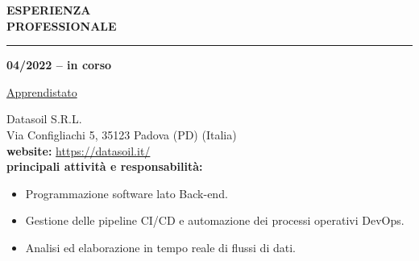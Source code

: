 \hspace{5mm}
\begin{minipage}[b]{0.3\textwidth}
	\textbf{ESPERIENZA \\PROFESSIONALE}
\end{minipage}%
\hfill
\hfill
\begin{minipage}[t]{0.6\textwidth}		
	\rule{\textwidth}{0.4pt}
\end{minipage}%
\vspace{5mm}


\begin{minipage}[t]{0.3\textwidth}
	\textbf{04/2022 – in corso}
\end{minipage}%
\hfill
\hfill
\begin{minipage}[t]{0.6\textwidth}		
	\begin{Large}
		\underline{Apprendistato} \vspace{1mm}\\
	\end{Large} 
		Datasoil S.R.L. \\
		Via Configliachi 5, 35123 Padova (PD) (Italia)\\
		\textbf{website:} \url{https://datasoil.it/} \vspace{1mm}\\
		\textbf{principali attività e responsabilità:}
		\begin{itemize}
			\item Programmazione software lato Back-end.
			\item Gestione delle pipeline CI/CD e automazione dei processi operativi DevOps.
			\item Analisi ed elaborazione in tempo reale di flussi di dati.
		\end{itemize}
	\vspace{4mm}
\end{minipage}%
\\